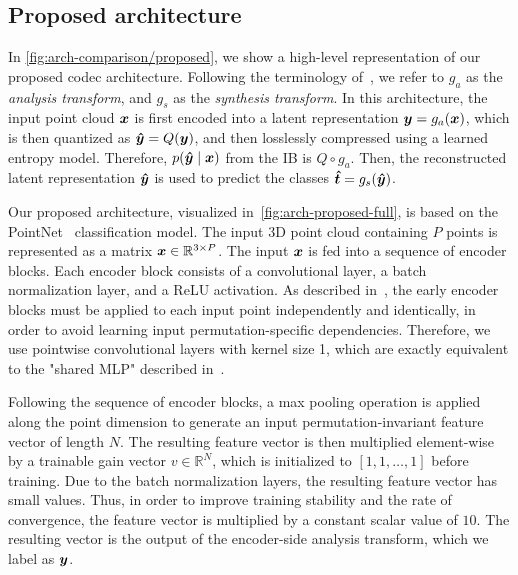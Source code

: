 \subsection{Proposed architecture}

In \cref{fig:arch-comparison/proposed}, we show a high-level representation of our proposed codec architecture.
Following the terminology of~\cite{balle2018variational}, we refer to $g_a$ as the \emph{analysis transform}, and $g_s$ as the \emph{synthesis transform}.
In this architecture, the input point cloud ${\boldsymbol{x}}$ is first encoded into a latent representation ${\boldsymbol{y}} = g_a({\boldsymbol{x}})$, which is then quantized as ${\boldsymbol{\hat{y}}} = Q({\boldsymbol{y}})$, and then losslessly compressed using a learned entropy model.
Therefore, $p({\boldsymbol{\hat{y}}} \mid {\boldsymbol{x}})$ from the IB is $Q \circ g_a$.
Then, the reconstructed latent representation ${\boldsymbol{\hat{y}}}$ is used to predict the classes ${\boldsymbol{\hat{t}}} = g_s({\boldsymbol{\hat{y}}})$.

Our proposed architecture, visualized in~\cref{fig:arch-proposed-full}, is based on the PointNet~\cite{qi2016pointnet} classification model.
The input 3D point cloud containing $P$ points is represented as a matrix ${\boldsymbol{x}} \in \mathbb{R}^{3 \times P}$.
The input ${\boldsymbol{x}}$ is fed into a sequence of encoder blocks.
Each encoder block consists of a convolutional layer, a batch normalization layer, and a ReLU activation.
As described in~\cite{qi2016pointnet}, the early encoder blocks must be applied to each input point independently and identically, in order to avoid learning input permutation-specific dependencies.
Therefore, we use pointwise convolutional layers with kernel size 1, which are exactly equivalent to the "shared MLP" described in~\cite{qi2016pointnet}.

Following the sequence of encoder blocks, a max pooling operation is applied along the point dimension to generate an input permutation-invariant feature vector of length $N$.
The resulting feature vector is then multiplied element-wise by a trainable gain vector $v \in \mathbb{R}^{N}$, which is initialized to $[1, 1, \ldots, 1]$ before training.
Due to the batch normalization layers, the resulting feature vector has small values.
Thus, in order to improve training stability and the rate of convergence, the feature vector is multiplied by a constant scalar value of $10$.
The resulting vector is the output of the encoder-side analysis transform, which we label as ${\boldsymbol{y}}$.


